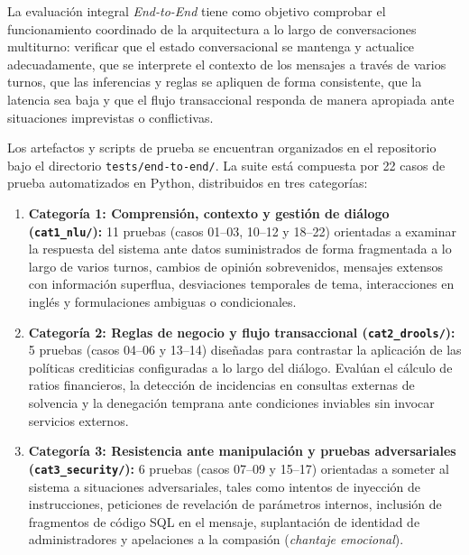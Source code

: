 \documentclass[12pt,a4paper]{report}
\begin{document}
La evaluación integral \textit{End-to-End} tiene como objetivo comprobar el funcionamiento coordinado de la arquitectura a lo largo de conversaciones multiturno: verificar que el estado conversacional se mantenga y actualice adecuadamente, que se interprete el contexto de los mensajes a través de varios turnos, que las inferencias y reglas se apliquen de forma consistente, que la latencia sea baja y que el flujo transaccional responda de manera apropiada ante situaciones imprevistas o conflictivas.

Los artefactos y scripts de prueba se encuentran organizados en el repositorio bajo el directorio \texttt{tests/end-to-end/}. La suite está compuesta por 22 casos de prueba automatizados en Python, distribuidos en tres categorías:

\begin{enumerate}
    \item \textbf{Categoría 1: Comprensión, contexto y gestión de diálogo (\texttt{cat1\_nlu/}):} 11 pruebas (casos 01--03, 10--12 y 18--22) orientadas a examinar la respuesta del sistema ante datos suministrados de forma fragmentada a lo largo de varios turnos, cambios de opinión sobrevenidos, mensajes extensos con información superflua, desviaciones temporales de tema, interacciones en inglés y formulaciones ambiguas o condicionales.
    
    \item \textbf{Categoría 2: Reglas de negocio y flujo transaccional (\texttt{cat2\_drools/}):} 5 pruebas (casos 04--06 y 13--14) diseñadas para contrastar la aplicación de las políticas crediticias configuradas a lo largo del diálogo. Evalúan el cálculo de ratios financieros, la detección de incidencias en consultas externas de solvencia y la denegación temprana ante condiciones inviables sin invocar servicios externos.
    
    \item \textbf{Categoría 3: Resistencia ante manipulación y pruebas adversariales (\texttt{cat3\_security/}):} 6 pruebas (casos 07--09 y 15--17) orientadas a someter al sistema a situaciones adversariales, tales como intentos de inyección de instrucciones, peticiones de revelación de parámetros internos, inclusión de fragmentos de código SQL en el mensaje, suplantación de identidad de administradores y apelaciones a la compasión (\textit{chantaje emocional}).
\end{enumerate}
\end{document}
